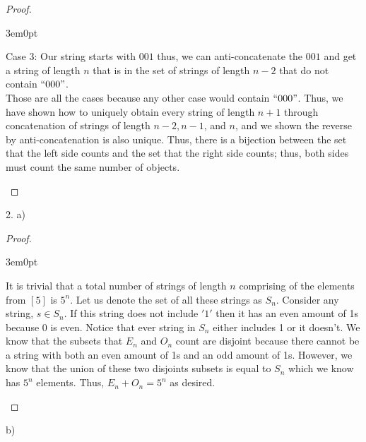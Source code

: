 \documentclass[11pt]{article}
\newenvironment{myproof}
{\begin{proof} \begin{adjustwidth}{3em}{0pt}$ $\par\nobreak\ignorespaces}
{\end{adjustwidth} \end{proof}}
\begin{document}
\begin{flushleft}
\begin{myproof}
\bigskip
Case 3: Our string starts with $001$ thus, we can anti-concatenate the $001$ and get a string of length $n$ that is in the set of strings of length $n-2$ that do not contain $``000"$. \\
\bigskip
Those are all the cases because any other case would contain $``000"$. Thus, we have shown how to uniquely obtain every string of length $n+1$ through concatenation of strings of length $n-2, n-1$, and $n$, and we shown the reverse by anti-concatenation is also unique. Thus, there is a bijection between the set that the left side counts and the set that the right side counts; thus, both sides must count the same number of objects.
\end{myproof}

\newpage

2. a)

\begin{myproof}
It is trivial that a total number of strings of length $n$ comprising of the elements from $[5]$ is $5^n$. Let us denote the set of all these strings as $S_n$. Consider any string, $s \in S_n$. If this string does not include $'1'$ then it has an even amount of 1s because 0 is even. Notice that ever string in $S_n$ either includes 1 or it doesn't. We know that the subsets that $E_n$ and $O_n$ count are disjoint because there cannot be a string with both an even amount of 1s and an odd amount of 1s. However, we know that the union of these two disjoints subsets is equal to $S_n$ which we know has $5^n$ elements. Thus, $E_n + O_n = 5^n$ as desired. 
\end{myproof}

b)


\end{flushleft}
\end{document}
